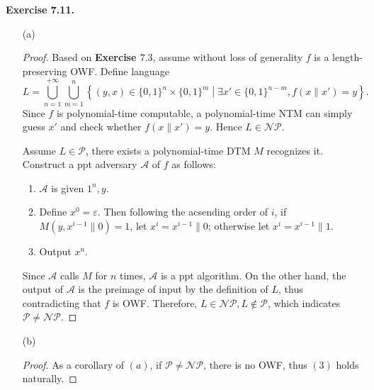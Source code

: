 \documentclass[a4paper]{article}
\newtheorem*{proof}{Proof}
\newenvironment{exercise}[1]{
	\par
	\noindent\textbf{Exercise #1.}\quad
}{
	\par
	\bigskip
}
\newcommand{\cbra}[1]{\left\{ #1 \right\}}
\newcommand{\bin}{\{0,1\}}
\newcommand{\ppt}{{\sc ppt} }
\newcommand{\Acal}{\mathcal{A}}
\begin{document}
\begin{exercise}{7.11}
\begin{itemize}
    \item[(a)]
        \begin{proof}
            Based on \textbf{Exercise $7.3$}, assume without loss of generality $f$ is a length-preserving OWF.
            Define language 
            $$
            L=\bigcup_{n=1}^{+\infty}\bigcup_{m=1}^n
            \cbra{(y,x)\in\bin^n\times\bin^m\middle|\exists x'\in\bin^{n-m},f(x\|x')=y}.
            $$
            Since $f$ is polynomial-time computable, a polynomial-time NTM can simply guess $x'$ and  
            check whether $f(x\|x')=y$. Hence $L\in\mathcal{NP}$.
            
            Assume $L\in\mathcal P$, there exists a polynomial-time DTM $M$ recognizes it.
            Construct a \ppt adversary $\Acal$ of $f$ as follows:
            \begin{enumerate}
                \item $\Acal$ is given $1^n,y$.
                \item Define $x^0=\varepsilon$. Then following the acsending order of $i$, 
                    if $M(y,x^{i-1}\|0)=1$, let $x^i=x^{i-1}\|0$; otherwise let $x^i=x^{i-1}\|1$.
                \item Output $x^n$.
            \end{enumerate}
            Since $\Acal$ calls $M$ for $n$ times, $\Acal$ is a \ppt algorithm.
            On the other hand, the output of $\Acal$ is the preimage of input by the definition of $L$,
            thus contradicting that $f$ is OWF.
            Therefore, $L\in\mathcal{NP},L\notin\mathcal P$, which indicates $\mathcal P\neq\mathcal{NP}$.
        \end{proof}
    \item[(b)]
        \begin{proof}
            As a corollary of $(a)$, if $\mathcal P\neq\mathcal{NP}$, there is no OWF, thus $(3)$ holds naturally.


\end{proof}
\end{itemize}
\end{exercise}
\end{document}
